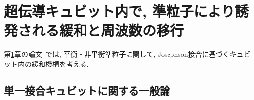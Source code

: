 \chapter{超伝導キュビット内で, 準粒子により誘発される緩和と周波数の移行} %
\label{cha:超伝導キュビット内で, 準粒子により誘発される緩和と周波数の移行}
第\ref{cha:超伝導キュビット内で, 準粒子により誘発される緩和と周波数の移行}章の論文~\cite{ToS}では, 平衡・非平衡準粒子に関して, Josephson接合に基づくキュビット内の緩和機構を考える. 

\section{単一接合キュビットに関する一般論} %
\label{sec:単一接合キュビットに関する一般論}
